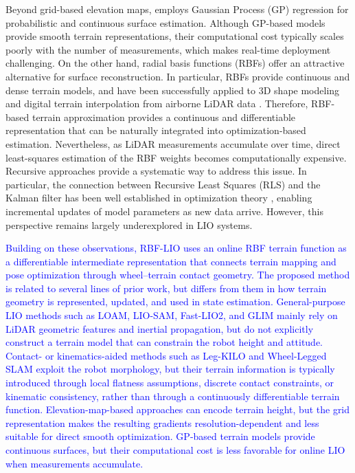 \documentclass[journal,twoside,web]{ieeecolor}
\newcommand{\cs}[1]{\textcolor{blue}{#1}}
\begin{document}
Beyond grid-based elevation maps, \cite{elevation_map_gp} employs Gaussian Process (GP) regression for probabilistic and continuous surface estimation. Although GP-based models provide smooth terrain representations, their computational cost typically scales poorly with the number of measurements, which makes real-time deployment challenging. On the other hand, radial basis functions (RBFs) offer an attractive alternative for surface reconstruction. In particular, RBFs provide continuous and dense terrain models, and have been successfully applied to 3D shape modeling \cite{rbf2001} and digital terrain interpolation from airborne LiDAR data \cite{rbf_air}. Therefore, RBF-based terrain approximation provides a continuous and differentiable representation that can be naturally integrated into optimization-based estimation. Nevertheless, as LiDAR measurements accumulate over time, direct least-squares estimation of the RBF weights becomes computationally expensive. Recursive approaches provide a systematic way to address this issue. In particular, the connection between Recursive Least Squares (RLS) and the Kalman filter has been well established in optimization theory \cite{OptVec}, enabling incremental updates of model parameters as new data arrive. However, this perspective remains largely underexplored in LIO systems.

\cs{Building on these observations, RBF-LIO uses an online RBF terrain function as a differentiable intermediate representation that connects terrain mapping and pose optimization through wheel--terrain contact geometry. The proposed method is related to several lines of prior work, but differs from them in how terrain geometry is represented, updated, and used in state estimation. General-purpose LIO methods such as LOAM, LIO-SAM, Fast-LIO2, and GLIM mainly rely on LiDAR geometric features and inertial propagation, but do not explicitly construct a terrain model that can constrain the robot height and attitude. Contact- or kinematics-aided methods such as Leg-KILO and Wheel-Legged SLAM exploit the robot morphology, but their terrain information is typically introduced through local flatness assumptions, discrete contact constraints, or kinematic consistency, rather than through a continuously differentiable terrain function. Elevation-map-based approaches can encode terrain height, but the grid representation makes the resulting gradients resolution-dependent and less suitable for direct smooth optimization. GP-based terrain models provide continuous surfaces, but their computational cost is less favorable for online LIO when measurements accumulate.}
\end{document}
